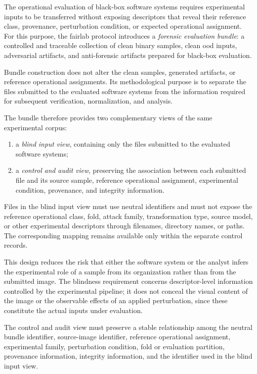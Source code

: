 The operational evaluation of black-box software systems requires experimental
inputs to be transferred without exposing descriptors that reveal their
reference class, provenance, perturbation condition, or expected operational
assignment. For this purpose, the \gls{fairlab} protocol introduces a
\textit{forensic evaluation bundle}: a controlled and traceable collection of
clean binary samples, clean \gls{ood} inputs, adversarial artifacts, and
anti-forensic artifacts prepared for black-box evaluation.

Bundle construction does not alter the clean samples, generated artifacts, or
reference operational assignments. Its methodological purpose is to separate
the files submitted to the evaluated software systems from the information
required for subsequent verification, normalization, and analysis.

The bundle therefore provides two complementary views of the same experimental
corpus:

\begin{enumerate}
\item a \textit{blind input view}, containing only the files submitted to the
evaluated software systems;

\item a \textit{control and audit view}, preserving the association between
each submitted file and its source sample, reference operational assignment,
experimental condition, provenance, and integrity information.
\end{enumerate}

Files in the blind input view must use neutral identifiers and must not expose
the reference operational class, fold, attack family, transformation type,
source model, or other experimental descriptors through filenames, directory
names, or paths. The corresponding mapping remains available only within the
separate control records.

This design reduces the risk that either the software system or the analyst
infers the experimental role of a sample from its organization rather than
from the submitted image. The blindness requirement concerns descriptor-level
information controlled by the experimental pipeline; it does not conceal the
visual content of the image or the observable effects of an applied
perturbation, since these constitute the actual inputs under evaluation.

The control and audit view must preserve a stable relationship among the
neutral bundle identifier, source-image identifier, reference operational
assignment, experimental family, perturbation condition, fold or evaluation
partition, provenance information, integrity information, and the identifier
used in the blind input view.

